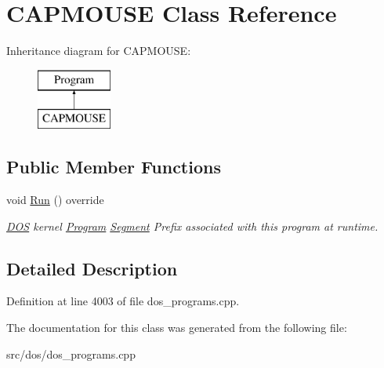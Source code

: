 \hypertarget{classCAPMOUSE}{\section{C\-A\-P\-M\-O\-U\-S\-E Class Reference}
\label{classCAPMOUSE}
}
Inheritance diagram for C\-A\-P\-M\-O\-U\-S\-E\-:\begin{figure}[H]
\begin{center}
\leavevmode
\includegraphics[height=2.000000cm]{classCAPMOUSE}
\end{center}
\end{figure}
\subsection*{Public Member Functions}
\begin{DoxyCompactItemize}
\item 
\hypertarget{classCAPMOUSE_a40f8a87bf9027081766fb5e0fc74149a}{void \hyperlink{classCAPMOUSE_a40f8a87bf9027081766fb5e0fc74149a}{Run} () override}\label{classCAPMOUSE_a40f8a87bf9027081766fb5e0fc74149a}

\begin{DoxyCompactList}\small\item\em \hyperlink{classDOS}{D\-O\-S} kernel \hyperlink{classProgram}{Program} \hyperlink{structSegment}{Segment} Prefix associated with this program at runtime. \end{DoxyCompactList}\end{DoxyCompactItemize}


\subsection{Detailed Description}


Definition at line 4003 of file dos\-\_\-programs.\-cpp.



The documentation for this class was generated from the following file\-:\begin{DoxyCompactItemize}
\item 
src/dos/dos\-\_\-programs.\-cpp\end{DoxyCompactItemize}
